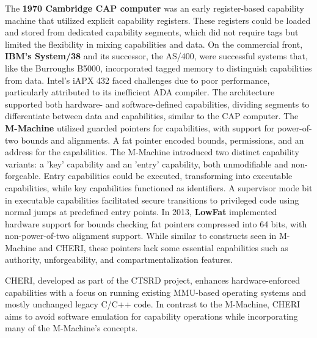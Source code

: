 The \textbf{1970 Cambridge CAP computer} was an early register-based capability machine that utilized explicit 
capability registers. These registers could be loaded and stored from dedicated capability 
segments, which did not require tags but limited the flexibility in mixing capabilities and data.
\newline
On the commercial front, \textbf{IBM's System/38} and its successor, the AS/400, were successful 
systems that, like the Burroughs B5000, incorporated tagged memory to distinguish 
capabilities from data. Intel's iAPX 432 faced challenges due to poor performance, 
particularly attributed to its inefficient ADA compiler. The architecture supported 
both hardware- and software-defined capabilities, dividing segments to differentiate 
between data and capabilities, similar to the CAP computer.
\newline
The \textbf{M-Machine} utilized guarded pointers for capabilities, with support for 
power-of-two bounds and alignments. A fat pointer encoded bounds, permissions, 
and an address for the capabilities. The M-Machine introduced two distinct 
capability variants: a 'key' capability and an 'entry' capability, both 
unmodifiable and non-forgeable. Entry capabilities could be executed, 
transforming into executable capabilities, while key capabilities 
functioned as identifiers. A supervisor mode bit in executable capabilities 
facilitated secure transitions to privileged code using normal jumps at predefined entry points.
\newline
In 2013, \textbf{LowFat} implemented hardware support for bounds checking fat pointers compressed into 
64 bits, with non-power-of-two alignment support. While similar to constructs seen in 
M-Machine and CHERI, these pointers lack some essential capabilities such as authority, 
unforgeability, and compartmentalization features.
\newline

CHERI, developed as part of the CTSRD project, enhances hardware-enforced capabilities 
with a focus on running existing MMU-based operating systems and mostly unchanged 
legacy C/C++ code. In contrast to the M-Machine, CHERI aims to avoid software 
emulation for capability operations while incorporating many of the M-Machine's concepts.

